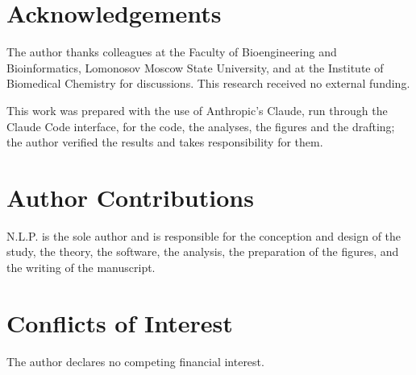 \documentclass[11pt]{article}
\theoremstyle{plain}
\theoremstyle{remark}
\begin{document}
\section*{Acknowledgements}
The author thanks colleagues at the Faculty of Bioengineering and Bioinformatics, Lomonosov Moscow
State University, and at the Institute of Biomedical Chemistry for discussions.
This research received no external funding.

This work was prepared with the use of Anthropic's Claude, run through the Claude Code interface,
for the code, the analyses, the figures and the drafting; the author verified the results and
takes responsibility for them.

\section*{Author Contributions}
N.L.P. is the sole author and is responsible for the conception and design of the study, the
theory, the software, the analysis, the preparation of the figures, and the writing of the
manuscript.

\section*{Conflicts of Interest}
The author declares no competing financial interest.
\end{document}
